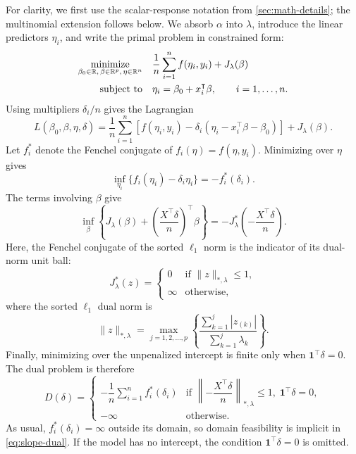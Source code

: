 \documentclass[a4paper,fleqn]{cas-sc}
\begin{document}
For clarity, we first use the scalar-response notation from
\autoref{sec:math-details}; the multinomial extension follows below. We absorb
\(\alpha\) into \(\lambda\), introduce the linear predictors \(\eta_i\), and
write the primal problem in constrained form:
\begin{equation}
  \begin{aligned}
    \operatorname*{minimize}_{\beta_0 \in \mathbb{R},\,\beta \in \mathbb{R}^p,\,\eta \in \mathbb{R}^n} \quad & \frac{1}{n} \sum_{i=1}^n f(\eta_i, y_i) + J_\lambda(\beta)       \\
    \text{subject to} \quad                                                                   & \eta_i = \beta_0 + x_i^\intercal \beta, \qquad i = 1, \ldots, n.
  \end{aligned}
\end{equation}
Using multipliers \(\delta_i/n\) gives the Lagrangian
\[
  L(\beta_0, \beta, \eta, \delta) = \frac{1}{n} \sum_{i=1}^n \left[ f(\eta_i, y_i) - \delta_i(\eta_i - x_i^\intercal\beta - \beta_0) \right]
                                    + J_\lambda(\beta).
\]
Let \(f_i^*\) denote the Fenchel conjugate of \(f_i(\eta) = f(\eta,y_i)\).
Minimizing over \(\eta\) gives
\[
  \inf_{\eta_i}\{f_i(\eta_i) - \delta_i\eta_i\} = -f_i^*(\delta_i).
\]
The terms involving \(\beta\) give
\[
  \inf_\beta \left\{ J_\lambda(\beta) + \left( \frac{X^\intercal\delta}{n} \right)^\intercal\beta \right\} = -J_\lambda^*\left( -\frac{X^\intercal\delta}{n} \right).
\]
Here, the Fenchel conjugate of the sorted \(\ell_1\) norm is the indicator of
its dual-norm unit ball:
\[
  J_\lambda^*(z) = \begin{cases}
                     0      & \text{if } \lVert z \rVert_{*,\lambda} \leq 1, \\
                     \infty & \text{otherwise},
                   \end{cases}
\]
where the sorted \(\ell_1\) dual norm is~\citep{negrinho2014}
\begin{equation}
  \lVert z \rVert_{*,\lambda} = \max_{j=1,2,\dots,p} \left\{ \frac{\sum_{k=1}^j|z_{(k)}|}{\sum_{k=1}^j\lambda_k} \right\}.
\end{equation}
Finally, minimizing over the unpenalized intercept is finite only when
\(\bm{1}^\intercal\delta = 0\). The dual problem is therefore
\begin{equation}
  D(\delta)
  = \begin{cases}
      -\dfrac{1}{n}\displaystyle\sum_{i=1}^n f_i^*(\delta_i) & \text{if } \left\lVert -\dfrac{X^\intercal\delta}{n} \right\rVert_{*,\lambda} \leq 1,\; \bm{1}^\intercal\delta = 0, \\
      -\infty                                                & \text{otherwise}.
    \end{cases} \label{eq:slope-dual}
\end{equation}
As usual, \(f_i^*(\delta_i) = \infty\) outside its domain, so domain feasibility
is implicit in \autoref{eq:slope-dual}. If the model has no intercept, the
condition \(\bm{1}^\intercal\delta = 0\) is omitted.
\end{document}
